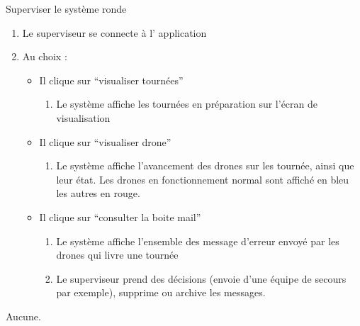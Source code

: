 \begin{UseCase}{Superviser le système ronde}
\begin{UseCaseScenario}
        \begin{enumerate}
            \item Le superviseur se connecte à l’ application
            \item Au choix :
                \begin{itemize}
                    \item Il clique sur “visualiser tournées”
                        \begin{enumerate}
                            \item Le système affiche les tournées en
                                préparation sur l’écran de visualisation
                        \end{enumerate}
                    \item Il clique sur “visualiser drone”
                        \begin{enumerate}
                            \item Le système affiche l'avancement des
                                drones sur les tournée, ainsi que leur état.
                                Les drones en fonctionnement normal
                                sont affiché en bleu les autres en rouge.
                        \end{enumerate}
                    \item Il clique sur “consulter la boite mail”
                        \begin{enumerate}
                            \item Le système affiche l’ensemble des message
                                d’erreur envoyé par les drones qui livre une tournée
                            \item Le superviseur prend des décisions (envoie
                                d’une équipe de secours par exemple), supprime
                                ou archive les messages.
                        \end{enumerate}
                \end{itemize}
        \end{enumerate}
\end{UseCaseScenario}

\begin{UseCaseExtension}
    Aucune.
\end{UseCaseExtension}

 \end{UseCase}